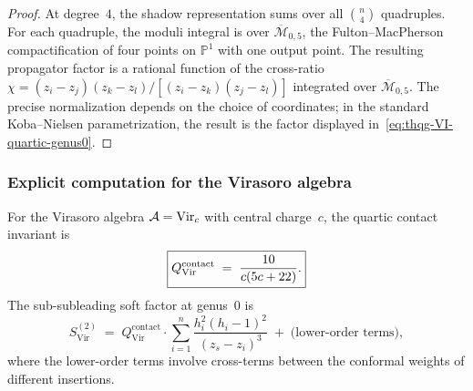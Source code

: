 \begin{proof}
At degree~$4$, the shadow representation sums over all
$\binom{n}{4}$ quadruples. For each quadruple, the moduli
integral is over $\overline{\mathcal{M}}_{0,5}$, the
Fulton--MacPherson compactification of four points on
$\mathbb{P}^1$ with one output point. The resulting propagator
factor is a rational function of the cross-ratio
$\chi = (z_i - z_j)(z_k - z_l)/[(z_i - z_k)(z_j - z_l)]$
integrated over $\overline{\mathcal{M}}_{0,5}$. The precise
normalization depends on the choice of coordinates;
in the standard Koba--Nielsen parametrization, the result is the
factor displayed in~\eqref{eq:thqg-VI-quartic-genus0}.
\end{proof}

\subsubsection{Explicit computation for the Virasoro algebra}

\begin{theorem}
\label{thm:thqg-VI-virasoro-quartic}
For the Virasoro algebra $\mathcal{A} = \mathrm{Vir}_c$ with central
charge~$c$, the quartic contact invariant is
\begin{equation}\label{eq:thqg-VI-virasoro-quartic}
\boxed{%
Q^{\mathrm{contact}}_{\mathrm{Vir}}
\;=\;
\frac{10}{c(5c + 22)}.}
\end{equation}
The sub-subleading soft factor at genus~$0$ is
\begin{equation}\label{eq:thqg-VI-virasoro-sub-subleading}
S^{(2)}_{\mathrm{Vir}}
\;=\;
Q^{\mathrm{contact}}_{\mathrm{Vir}}
\cdot
\sum_{i=1}^{n}
\frac{h_i^2(h_i - 1)^2}{(z_s - z_i)^3}\;
+\; \text{(lower-order terms)},
\end{equation}
where the lower-order terms involve cross-terms between the
conformal weights of different insertions.
\end{theorem}

